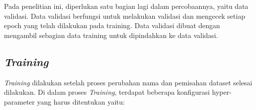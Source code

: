 

Pada penelitian ini, diperlukan satu bagian lagi dalam percobaannya, yaitu data validasi. 
Data validasi berfungsi untuk melakukan validasi dan mengecek setiap epoch yang telah 
dilakukan pada training. Data validasi dibuat dengan mengambil sebagian data training 
untuk dipindahkan ke data validasi.



\subsection{\emph{Training}}

\emph{Training} dilakukan setelah proses perubahan nama dan pemisahan dataset selesai dilakukan. 
Di dalam proses \emph{Training}, terdapat beberapa konfigurasi hyper-parameter yang harus 
ditentukan yaitu:

